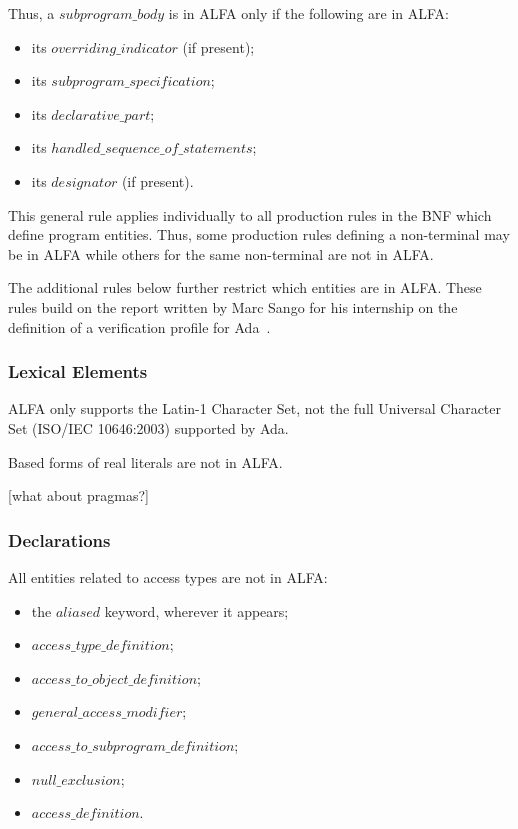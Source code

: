 \documentclass{article}
\newcommand{\bnf}[1]{$\mathit{#1}$}
\begin{document}
Thus, a \bnf{subprogram\_body} is in ALFA only if the following are in ALFA:
\begin{itemize}
\item its \bnf{overriding\_indicator} (if present);
\item its \bnf{subprogram\_specification};
\item its \bnf{declarative\_part};
\item its \bnf{handled\_sequence\_of\_statements};
\item its \bnf{designator} (if present).
\end{itemize}

This general rule applies individually to all production rules in the BNF
which define program entities. Thus, some production rules defining a
non-terminal may be in ALFA while others for the same non-terminal are not in
ALFA.

The additional rules below further restrict which entities are in ALFA. These
rules build on the report written by Marc Sango for his internship on the
definition of a verification profile for Ada~\cite{Sango2010RR}. 

\subsubsection{Lexical Elements}

ALFA only supports the Latin-1 Character Set, not the full Universal Character
Set (ISO/IEC 10646:2003) supported by Ada.

Based forms of real literals are not in ALFA.

[what about pragmas?]

\subsubsection{Declarations}

All entities related to access types are not in ALFA:
\begin{itemize}
\item the \bnf{aliased} keyword, wherever it appears;
\item \bnf{access\_type\_definition};
\item \bnf{access\_to\_object\_definition};
\item \bnf{general\_access\_modifier};
\item \bnf{access\_to\_subprogram\_definition};
\item \bnf{null\_exclusion};
\item \bnf{access\_definition}.
\end{itemize}
\end{document}
